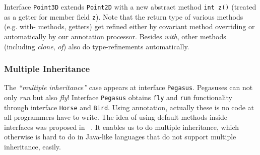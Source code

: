 Interface \texttt{Point3D} extends \texttt{Point2D} with a new abstract method
\texttt{int z()} (treated as a getter for member field \texttt{z}). Note that
the return type of various methods (e.g. with- methods, getters) get refined
either by covariant method overriding or automatically by our annotation
processor. Besides \emph{with}, other methods (including \emph{clone},
\emph{of}) also do type-refinements automatically.

\subsubsection{Multiple Inheritance}
The \emph{``multiple inheritance''} case appears at interface
\texttt{Pegasus}. Pegasuses can not only \emph{run} but also \emph{fly}!
Interface \texttt{Pegasus} obtains \texttt{fly} and \texttt{run} functionality
through interface \texttt{Horse} and \texttt{Bird}. Using \mixin annotation,
actually these is no code at all programmers have to write. The idea of using
default methods inside interfaces was proposed in ~\cite{}. It enables us to do
multiple inheritance, which otherwise is hard to do in Java-like languages that
do not support multiple inheritance, easily.


